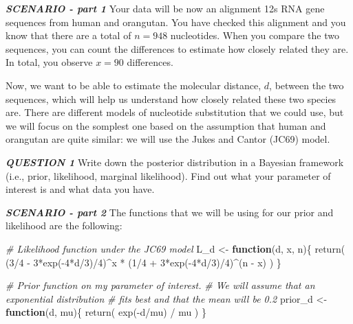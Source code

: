 \documentclass[
]{article}
\newenvironment{Shaded}{\begin{snugshade}}{\end{snugshade}}
\newcommand{\CommentTok}[1]{\textcolor[rgb]{0.56,0.35,0.01}{\textit{#1}}}
\newcommand{\ControlFlowTok}[1]{\textcolor[rgb]{0.13,0.29,0.53}{\textbf{#1}}}
\newcommand{\DecValTok}[1]{\textcolor[rgb]{0.00,0.00,0.81}{#1}}
\newcommand{\FunctionTok}[1]{\textcolor[rgb]{0.00,0.00,0.00}{#1}}
\newcommand{\NormalTok}[1]{#1}
\newcommand{\OtherTok}[1]{\textcolor[rgb]{0.56,0.35,0.01}{#1}}
\newcommand{\SpecialCharTok}[1]{\textcolor[rgb]{0.00,0.00,0.00}{#1}}
\begin{document}
\emph{\textbf{SCENARIO - part 1}} Your data will be now an alignment 12s
RNA gene sequences from human and orangutan. You have checked this
alignment and you know that there are a total of \(n = 948\)
nucleotides. When you compare the two sequences, you can count the
differences to estimate how closely related they are. In total, you
observe \(x = 90\) differences.

Now, we want to be able to estimate the molecular distance, \(d\),
between the two sequences, which will help us understand how closely
related these two species are. There are different models of nucleotide
substitution that we could use, but we will focus on the somplest one
based on the assumption that human and orangutan are quite similar: we
will use the Jukes and Cantor (JC69) model.

\emph{\textbf{QUESTION 1}} Write down the posterior distribution in a
Bayesian framework (i.e., prior, likelihood, marginal likelihood). Find
out what your parameter of interest is and what data you have.

\emph{\textbf{SCENARIO - part 2}} The functions that we will be using
for our prior and likelihood are the following:

\begin{Shaded}
\begin{Highlighting}[]
\CommentTok{\# Likelihood function under the JC69 model}
\NormalTok{L\_d }\OtherTok{\textless{}{-}} \ControlFlowTok{function}\NormalTok{(d, x, n)\{}
  \FunctionTok{return}\NormalTok{( (}\DecValTok{3}\SpecialCharTok{/}\DecValTok{4} \SpecialCharTok{{-}} \DecValTok{3}\SpecialCharTok{*}\FunctionTok{exp}\NormalTok{(}\SpecialCharTok{{-}}\DecValTok{4}\SpecialCharTok{*}\NormalTok{d}\SpecialCharTok{/}\DecValTok{3}\NormalTok{)}\SpecialCharTok{/}\DecValTok{4}\NormalTok{)}\SpecialCharTok{\^{}}\NormalTok{x }\SpecialCharTok{*}\NormalTok{ (}\DecValTok{1}\SpecialCharTok{/}\DecValTok{4} \SpecialCharTok{+} \DecValTok{3}\SpecialCharTok{*}\FunctionTok{exp}\NormalTok{(}\SpecialCharTok{{-}}\DecValTok{4}\SpecialCharTok{*}\NormalTok{d}\SpecialCharTok{/}\DecValTok{3}\NormalTok{)}\SpecialCharTok{/}\DecValTok{4}\NormalTok{)}\SpecialCharTok{\^{}}\NormalTok{(n }\SpecialCharTok{{-}}\NormalTok{ x) )}
\NormalTok{\}}

\CommentTok{\# Prior function on my parameter of interest.}
\CommentTok{\# We will assume that an exponential distribution }
\CommentTok{\# fits best and that the mean will be 0.2}
\NormalTok{prior\_d }\OtherTok{\textless{}{-}} \ControlFlowTok{function}\NormalTok{(d, mu)\{}
  \FunctionTok{return}\NormalTok{( }\FunctionTok{exp}\NormalTok{(}\SpecialCharTok{{-}}\NormalTok{d}\SpecialCharTok{/}\NormalTok{mu) }\SpecialCharTok{/}\NormalTok{ mu )}
\NormalTok{\}}
\end{Highlighting}
\end{Shaded}
\end{document}
